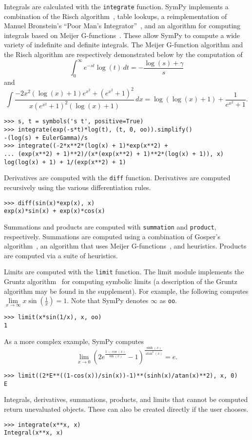 Integrals are calculated with the \verb|integrate| function. SymPy
implements a combination of the Risch
algorithm~\cite{bronstein2005integration}, table lookups, a reimplementation
of Manuel Bronstein's ``Poor Man's Integrator''~\cite{Bronstein2005pmint}, and
an algorithm for computing integrals based on Meijer G-functions~\cite{Roach1996hyper,roach1997meijerg}. These allow
SymPy to compute a wide variety of indefinite and definite integrals. The
Meijer G-function algorithm and the Risch algorithm are respectively
demonstrated below by the computation of \[\int_{0}^{\infty} e^{-s t}\log{\left
      (t \right )}\, dt = - \frac{ \log{\left (s \right
    )} + \gamma}{s}\] and \[\int \frac{- 2 x^{2}
  \left(\log{\left (x \right )} + 1\right) e^{x^{2}} + \left(e^{x^{2}} +
    1\right)^{2}}{x \left(e^{x^{2}} + 1\right)^{2} \left(\log{\left (x \right
      )} + 1\right)}\, dx = \log{\left (\log{\left (x \right )} + 1 \right )}
+ \frac{1}{e^{x^{2}} + 1}.\]
\begin{verbatim}
>>> s, t = symbols('s t', positive=True)
>>> integrate(exp(-s*t)*log(t), (t, 0, oo)).simplify()
-(log(s) + EulerGamma)/s
>>> integrate((-2*x**2*(log(x) + 1)*exp(x**2) +
... (exp(x**2) + 1)**2)/(x*(exp(x**2) + 1)**2*(log(x) + 1)), x)
log(log(x) + 1) + 1/(exp(x**2) + 1)
\end{verbatim}

Derivatives are computed with the \verb|diff| function. Derivatives are
computed recursively using the various differentiation rules.
\begin{verbatim}
>>> diff(sin(x)*exp(x), x)
exp(x)*sin(x) + exp(x)*cos(x)
\end{verbatim}

Summations and products are computed with \verb|summation| and \verb|product|,
respectively. Summations are computed using a combination of Gosper's
algorithm~\cite{gosper1978decision}, an algorithm that uses Meijer G-functions~\cite{Roach1996hyper,roach1997meijerg}, and heuristics. Products
are computed via a suite of heuristics.

Limits are computed with the \verb|limit| function. The limit module
implements the Gruntz algorithm~\cite{Gruntz1996limits} for computing symbolic
limits (a description of the Gruntz algorithm may be found in the supplement).
For example, the following computes
$\lim\limits_{x\to \infty} x\sin(\frac{1}{x})=1$. Note that SymPy denotes
$\infty$ as \verb|oo|.
\begin{verbatim}
>>> limit(x*sin(1/x), x, oo)
1
\end{verbatim}
As a more complex example, SymPy computes \[\lim\limits_{x\to 0}{\left(2 e^{\frac{1 - \cos{\left (x \right )}}{\sin{\left (x \right )}}} -
  1\right)}^{\frac{\sinh{\left (x \right )}}{\operatorname{atan}^{2}{\left (x
      \right )}}} = e.\]
\begin{verbatim}
>>> limit((2*E**((1-cos(x))/sin(x))-1)**(sinh(x)/atan(x)**2), x, 0)
E
\end{verbatim}

Integrals, derivatives, summations, products, and limits that cannot be
computed return unevaluated objects. These can also be created directly if the
user chooses.
\begin{verbatim}
>>> integrate(x**x, x)
Integral(x**x, x)
\end{verbatim}
